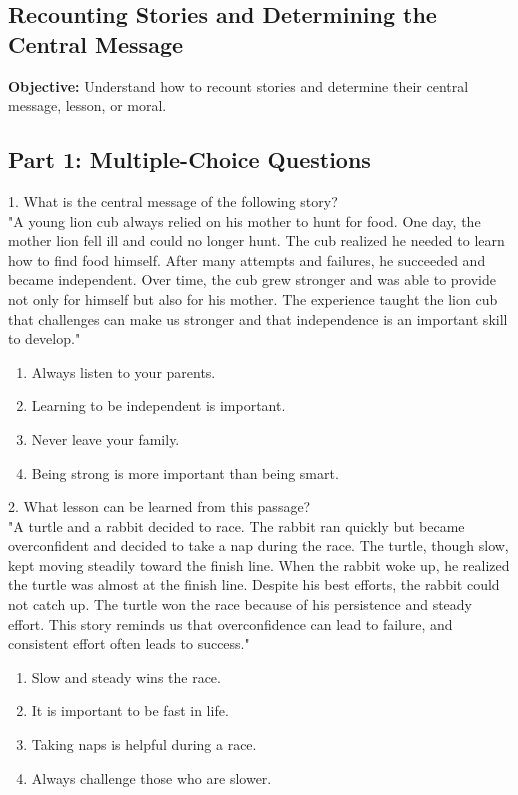 \documentclass[12pt]{article}
\begin{document}
\subsection*{Recounting Stories and Determining the Central Message}
\onehalfspacing

\begin{tcolorbox}[colframe=black!40, colback=gray!0, title=Learning Objective]
\textbf{Objective:} Understand how to recount stories and determine their central message, lesson, or moral.
\end{tcolorbox}

\subsection*{Part 1: Multiple-Choice Questions}

1. What is the central message of the following story? \\
"A young lion cub always relied on his mother to hunt for food. One day, the mother lion fell ill and could no longer hunt. The cub realized he needed to learn how to find food himself. After many attempts and failures, he succeeded and became independent. Over time, the cub grew stronger and was able to provide not only for himself but also for his mother. The experience taught the lion cub that challenges can make us stronger and that independence is an important skill to develop."\\
\begin{enumerate}[label=\Alph*.]
    \item Always listen to your parents.
    \item Learning to be independent is important.
    \item Never leave your family.
    \item Being strong is more important than being smart.
\end{enumerate}

\vspace{1cm}

2. What lesson can be learned from this passage?\\
"A turtle and a rabbit decided to race. The rabbit ran quickly but became overconfident and decided to take a nap during the race. The turtle, though slow, kept moving steadily toward the finish line. When the rabbit woke up, he realized the turtle was almost at the finish line. Despite his best efforts, the rabbit could not catch up. The turtle won the race because of his persistence and steady effort. This story reminds us that overconfidence can lead to failure, and consistent effort often leads to success."\\
\begin{enumerate}[label=\Alph*.]
    \item Slow and steady wins the race.
    \item It is important to be fast in life.
    \item Taking naps is helpful during a race.
    \item Always challenge those who are slower.
\end{enumerate}
\end{document}
